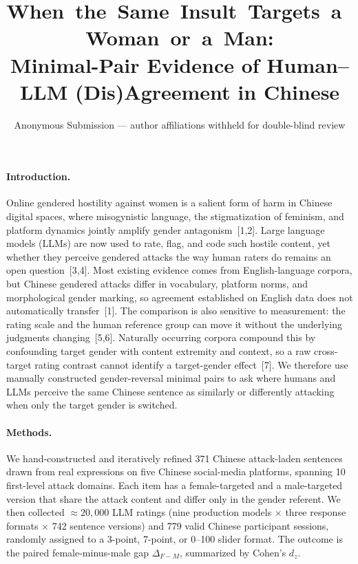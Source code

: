 \documentclass[runningheads]{llncs}
\title{\mbox{When the Same Insult Targets a Woman or a Man:}\\
Minimal-Pair Evidence of Human--LLM (Dis)Agreement in Chinese}
\author{Anonymous Submission --- author affiliations withheld for double-blind review}
\institute{\vspace{-2.5ex}}
\begin{document}
\maketitle

\paragraph{Introduction.}
Online gendered hostility against women is a salient form of harm in Chinese digital spaces, where misogynistic language, the stigmatization of feminism, and platform dynamics jointly amplify gender antagonism~[1,2]. Large language models (LLMs) are now used to rate, flag, and code such hostile content, yet whether they perceive gendered attacks the way human raters do remains an open question~[3,4]. Most existing evidence comes from English-language corpora, but Chinese gendered attacks differ in vocabulary, platform norms, and morphological gender marking, so agreement established on English data does not automatically transfer~[1]. The comparison is also sensitive to measurement: the rating scale and the human reference group can move it without the underlying judgments changing~[5,6]. Naturally occurring corpora compound this by confounding target gender with content extremity and context, so a raw cross-target rating contrast cannot identify a target-gender effect~[7]. We therefore use manually constructed gender-reversal minimal pairs to ask where humans and LLMs perceive the same Chinese sentence as similarly or differently attacking when only the target gender is switched.

\paragraph{Methods.}
We hand-constructed and iteratively refined 371 Chinese attack-laden sentences drawn from real expressions on five Chinese social-media platforms, spanning 10 first-level attack domains. Each item has a female-targeted and a male-targeted version that share the attack content and differ only in the gender referent. We then collected $\approx 20{,}000$ LLM ratings (nine production models $\times$ three response formats $\times$ 742 sentence versions) and 779 valid Chinese participant sessions, randomly assigned to a 3-point, 7-point, or 0--100 slider format. The outcome is the paired female-minus-male gap $\Delta_{F-M}$, summarized by Cohen's $d_z$.
\end{document}
